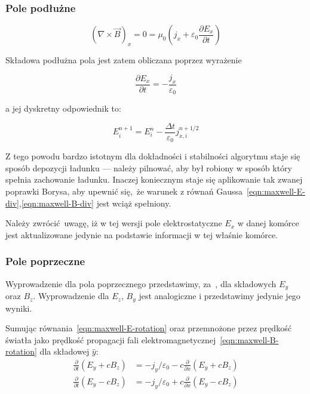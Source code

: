 \subsubsection{Pole podłużne}

\begin{equation}
    \left(\nabla \times \vec{B}\right)_x = 0 = \mu_0 \left(j_x + \varepsilon_0 \frac{\partial E_x}{\partial t}\right)
    \label{eqn:longitudinal-field-eq}
 \end{equation}

Składowa podłużna pola jest zatem obliczana poprzez wyrażenie

\begin{equation}
\frac{\partial E_x}{\partial t} = - \frac{j_x}{\varepsilon_0}
\label{longitudinal-field-differential}
\end{equation}

a jej dyskretny odpowiednik to:

\begin{equation}
    E_i^{n+1} = E_i^n - \frac{\Delta t}{\varepsilon_0} j_{x,i}^{n+1/2}
\label{longitudinal-field-finite-differential}
\end{equation}


Z tego powodu bardzo istotnym dla dokładności i stabilności algorytmu staje
się sposób depozycji ładunku --- należy pilnować, aby był robiony w sposób
który spełnia zachowanie ładunku. Inaczej koniecznym staje się aplikowanie
tak zwanej poprawki Borysa\cite{lehe_2017},
aby upewnić się, że warunek z równań Gaussa~\ref{eqn:maxwell-E-div},\ref{eqn:maxwell-B-div}
jest wciąż spełniony.

Należy zwrócić uwagę, iż w tej wersji pole elektrostatyczne $E_x$ w danej komórce jest
aktualizowane jedynie na podstawie informacji w tej właśnie komórce.

\subsubsection{Pole poprzeczne}
Wyprowadzenie dla pola poprzecznego przedstawimy, za~\cite{birdsall}, dla składowych $E_y$ oraz $B_z$. Wyprowadzenie dla $E_z$, $B_y$ jest analogiczne i przedstawimy jedynie jego wyniki.

Sumując równania~\ref{eqn:maxwell-E-rotation} oraz przemnożone przez prędkość światła jako prędkość propagacji fali elektromagnetycznej~\ref{eqn:maxwell-B-rotation} dla składowej $\hat{y}$:
\begin{align}
    \frac{\partial}{\partial t} \left(E_y + c B_z\right) &= - j_y / \varepsilon_0 - c \frac{\partial}{\partial x} \left(E_y + c B_z\right) \\
    \frac{\partial}{\partial t} \left(E_y - c B_z\right) &= - j_y / \varepsilon_0 + c \frac{\partial}{\partial x} \left(E_y - c B_z\right)
\end{align}

